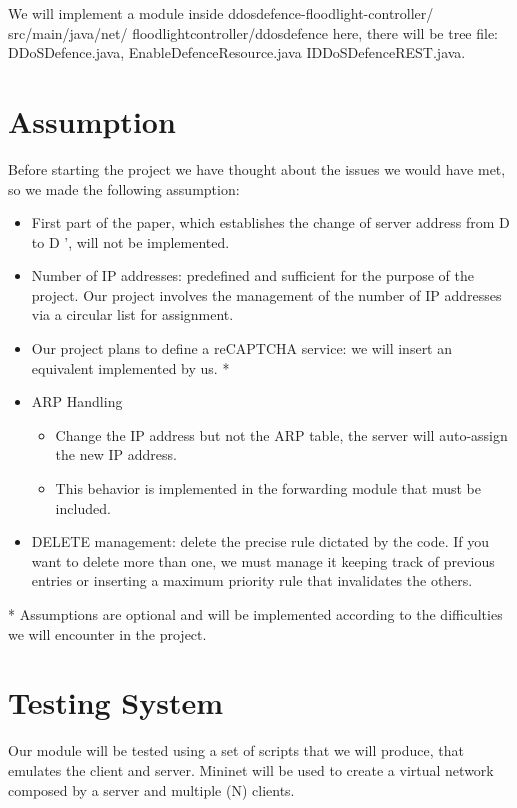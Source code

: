 We will implement a module inside ddosdefence-floodlight-controller/ src/main/java/net/ floodlightcontroller/ddosdefence here, there will be tree file: DDoSDefence.java, EnableDefenceResource.java IDDoSDefenceREST.java.

\section{Assumption}
Before starting the project we have thought about the issues we would have met, so we made the following assumption:
\begin{itemize}
	\item First part of the paper, which establishes the change of server address from D to D ', will not be implemented.
	\item Number of IP addresses: predefined and sufficient for the purpose of the project. Our project involves the management of the number of IP addresses via a circular list for assignment. 
	\item Our project plans to define a reCAPTCHA service: we will insert an equivalent implemented by us. *
	\item ARP Handling 
		\begin{itemize}
			\item Change the IP address but not the ARP table, the server will auto-assign the new IP address.
			\item This behavior is implemented in the forwarding module that must be included.
		\end{itemize}
	\item DELETE management: delete the precise rule dictated by the code. If you want to delete more than one, we must manage it keeping track of previous entries or inserting a maximum priority rule that invalidates the others.
\end{itemize}
* Assumptions are optional and will be implemented according to the difficulties we will encounter in the project.

\section{Testing System}
Our module will be tested using a set of scripts that we will produce, that emulates the client and server. Mininet will be used to create a virtual network composed  by a server and multiple (N) clients.

